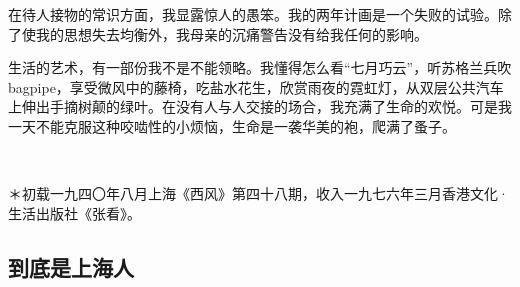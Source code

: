 \par 在待人接物的常识方面，我显露惊人的愚笨。我的两年计画是一个失败的试验。除了使我的思想失去均衡外，我母亲的沉痛警告没有给我任何的影响。
\par 生活的艺术，有一部份我不是不能领略。我懂得怎么看“七月巧云”，听苏格兰兵吹bagpipe，享受微风中的藤椅，吃盐水花生，欣赏雨夜的霓虹灯，从双层公共汽车上伸出手摘树颠的绿叶。在没有人与人交接的场合，我充满了生命的欢悦。可是我一天不能克服这种咬啮性的小烦恼，生命是一袭华美的袍，爬满了蚤子。
\par {}
\par  
\par ＊初载一九四〇年八月上海《西风》第四十八期，收入一九七六年三月香港文化·生活出版社《张看》。


\subsection{到底是上海人}

